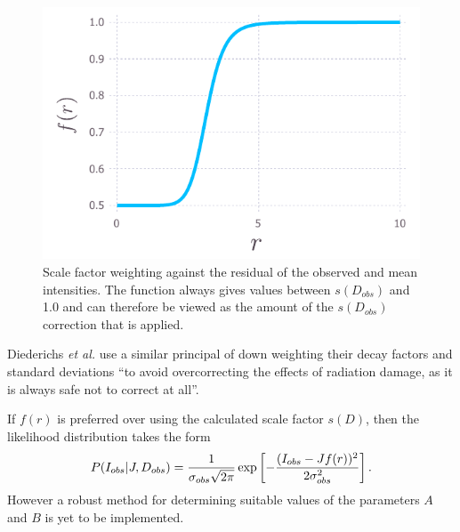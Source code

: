 \begin{figure}
  \centering
    \includegraphics[width=1\textwidth]{figures/zde/scale_factor_function.pdf}
    \caption{Scale factor weighting against the residual of the observed and mean intensities.
    The function always gives values between $s(D_{obs})$ and 1.0 and can therefore be viewed as the amount of the $s(D_{obs})$ correction that is applied.}
    \label{fig:Scale factor weighting - Extrapolation method}
\end{figure}
Diederichs \textit{et al.} \cite{diederichs2003} use a similar principal of down weighting their decay factors and standard deviations ``to avoid overcorrecting the effects of radiation damage, as it is always safe not to correct at all''\cite{diederichs2003}.

If $f(r)$ is preferred over using the calculated scale factor $s(D)$, then the likelihood distribution takes the form
\begin{equation}
    P(I_{obs} | J, D_{obs}) = \frac{1}{\sigma_{obs} \sqrt{2\pi}} \exp \left[-\frac{(I_{obs} - J f(r))^2}{2 \sigma^2_{obs}} \right].
    \label{eq:Normally distributed intensity with weighted scale factor - Extrapolation method}
\end{equation}
However a robust method for determining suitable values of the parameters $A$ and $B$ is yet to be implemented.

